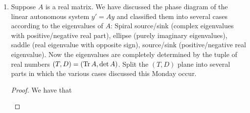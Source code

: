 \documentclass[../psets.tex]{subfiles}
\begin{document}
\begin{enumerate}
\begin{enumerate}
\begin{proof}
            as desired.\par
            \underline{Right equality above}: Suppose $\e[A]=Q\e[B]Q^{-1}$ where $B$ is in JNF. Then
            \begin{align*}
                \det\e[A] &= \det\e[B]\\
                &= \e[\lambda_1]\cdot\e[\lambda_2]\\
                &= \e[\lambda_1+\lambda_2]\\
                &= \e[\Trc B]\\
                &= \e[\Trc A]
            \end{align*}
            where we have the first equality because the determinant is invariant under similarity; the second equality because $\e[B]$ is upper triangular, the determinant of an upper triangular matrix is equal to the product of the diagonal entries, and the diagonal entries of $\e[B]$ are the exponentials of the eigenvalues of $A$; and the remainder of the equalities for fairly evident reasons.
        \end{proof}
        \item Suppose $A$ is a real matrix. We have discussed the phase diagram of the linear autonomous system $y'=Ay$ and classified them into several cases according to the eigenvalues of $A$: Spiral source/sink (complex eigenvalues with positive/negative real part), ellipse (purely imaginary eigenvalues), saddle (real eigenvalue with opposite sign), source/sink (positive/negative real eigenvalue). Now the eigenvalues are completely determined by the tuple of real numbers $(T,D)=(\operatorname{Tr} A,\det A)$. Split the $(T,D)$ plane into several parts in which the various cases discussed this Monday occur.
        \begin{proof}
            We have that
            \begin{center}
                \footnotesize
\end{center}
\end{proof}
\end{enumerate}
\end{enumerate}
\end{document}
